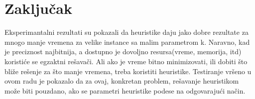 \documentclass[a4paper]{article}
\begin{document}
\section{Zaključak}

Eksperimantalni rezultati su pokazali da heuristike daju jako dobre rezultate za mnogo manje vremena za velike instance sa malim parametrom k. Naravno, kad je preciznost najbitnija, a dostupno je dovoljno resursa(vreme, memorija, itd) koristiće se egzaktni rešavači. Ali ako je vreme bitno minimizovati, ili dobiti što bliže rešenje za što manje vremena, treba koristiti heuristike. Testiranje vršeno u ovom radu je pokazalo da za ovaj, konkretan problem, rešavanje heuristikom može biti pouzdano, ako se parametri heuristike podese na odgovarajući način.

\appendix
 

\end{document}
